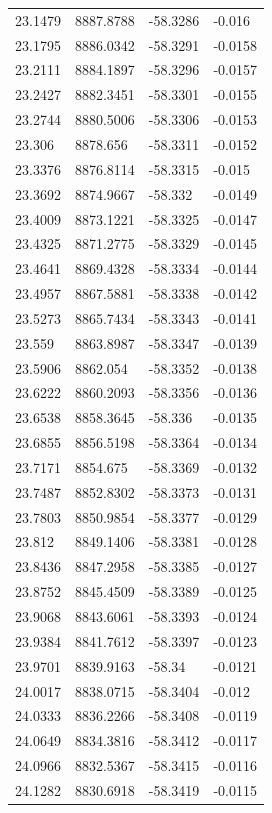 \begin{table}[H]
\begin{tabular}{llll}
23.1479 & 8887.8788 & -58.3286 & -0.016 \\
23.1795 & 8886.0342 & -58.3291 & -0.0158 \\
23.2111 & 8884.1897 & -58.3296 & -0.0157 \\
23.2427 & 8882.3451 & -58.3301 & -0.0155 \\
23.2744 & 8880.5006 & -58.3306 & -0.0153 \\
23.306 & 8878.656 & -58.3311 & -0.0152 \\
23.3376 & 8876.8114 & -58.3315 & -0.015 \\
23.3692 & 8874.9667 & -58.332 & -0.0149 \\
23.4009 & 8873.1221 & -58.3325 & -0.0147 \\
23.4325 & 8871.2775 & -58.3329 & -0.0145 \\
23.4641 & 8869.4328 & -58.3334 & -0.0144 \\
23.4957 & 8867.5881 & -58.3338 & -0.0142 \\
23.5273 & 8865.7434 & -58.3343 & -0.0141 \\
23.559 & 8863.8987 & -58.3347 & -0.0139 \\
23.5906 & 8862.054 & -58.3352 & -0.0138 \\
23.6222 & 8860.2093 & -58.3356 & -0.0136 \\
23.6538 & 8858.3645 & -58.336 & -0.0135 \\
23.6855 & 8856.5198 & -58.3364 & -0.0134 \\
23.7171 & 8854.675 & -58.3369 & -0.0132 \\
23.7487 & 8852.8302 & -58.3373 & -0.0131 \\
23.7803 & 8850.9854 & -58.3377 & -0.0129 \\
23.812 & 8849.1406 & -58.3381 & -0.0128 \\
23.8436 & 8847.2958 & -58.3385 & -0.0127 \\
23.8752 & 8845.4509 & -58.3389 & -0.0125 \\
23.9068 & 8843.6061 & -58.3393 & -0.0124 \\
23.9384 & 8841.7612 & -58.3397 & -0.0123 \\
23.9701 & 8839.9163 & -58.34 & -0.0121 \\
24.0017 & 8838.0715 & -58.3404 & -0.012 \\
24.0333 & 8836.2266 & -58.3408 & -0.0119 \\
24.0649 & 8834.3816 & -58.3412 & -0.0117 \\
24.0966 & 8832.5367 & -58.3415 & -0.0116 \\
24.1282 & 8830.6918 & -58.3419 & -0.0115 \\

\end{tabular}
\end{table}
